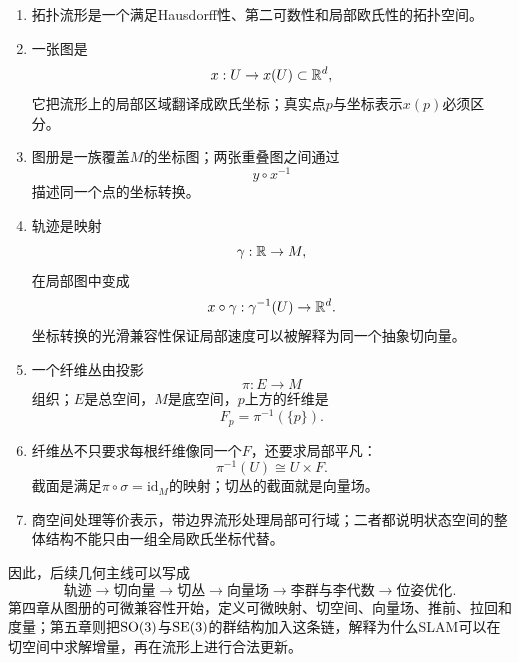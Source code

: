 \begin{enumerate}
    \item 拓扑流形是一个满足Hausdorff性、第二可数性和局部欧氏性的拓扑空间。
    \item 一张图是
    \[
        x:U\to x(U)\subset\mathbb{R}^d,
    \]
    它把流形上的局部区域翻译成欧氏坐标；真实点$p$与坐标表示$x(p)$必须区分。
    \item 图册是一族覆盖$M$的坐标图；两张重叠图之间通过
    \[
        y\circ x^{-1}
    \]
    描述同一个点的坐标转换。
    \item 轨迹是映射
    \[
        \gamma:\mathbb{R}\to M,
    \]
    在局部图中变成
    \[
        x\circ\gamma:\gamma^{-1}(U)\to\mathbb{R}^d.
    \]
    坐标转换的光滑兼容性保证局部速度可以被解释为同一个抽象切向量。
    \item 一个纤维丛由投影
    \[
        \pi:E\to M
    \]
    组织；$E$是总空间，$M$是底空间，$p$上方的纤维是
    \[
        F_p=\pi^{-1}(\{p\}).
    \]
    \item 纤维丛不只要求每根纤维像同一个$F$，还要求局部平凡：
    \[
        \pi^{-1}(U)\cong U\times F.
    \]
    截面是满足$\pi\circ\sigma=\mathrm{id}_M$的映射；切丛的截面就是向量场。
    \item 商空间处理等价表示，带边界流形处理局部可行域；二者都说明状态空间的整体结构不能只由一组全局欧氏坐标代替。
\end{enumerate}

因此，后续几何主线可以写成
\[
    \text{轨迹}
    \longrightarrow
    \text{切向量}
    \longrightarrow
    \text{切丛}
    \longrightarrow
    \text{向量场}
    \longrightarrow
    \text{李群与李代数}
    \longrightarrow
    \text{位姿优化}.
\]
第四章从图册的可微兼容性开始，定义可微映射、切空间、向量场、推前、拉回和度量；第五章则把$\operatorname{SO}(3)$与$\operatorname{SE}(3)$的群结构加入这条链，解释为什么SLAM可以在切空间中求解增量，再在流形上进行合法更新。
